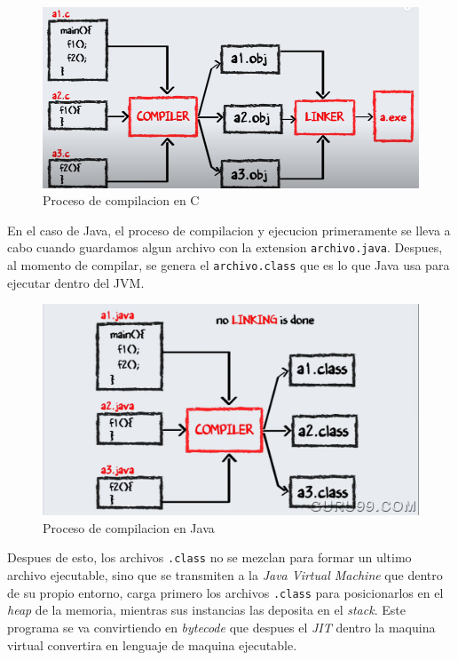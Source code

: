 \documentclass{article}
\begin{document}
		\begin{figure}[H]
			\centering
			\includegraphics[scale = 0.3]{images/comp}
			\caption{Proceso de compilacion en C}
		\end{figure}
		
		En el caso de Java, el proceso de compilacion y ejecucion primeramente se lleva a cabo cuando guardamos algun archivo con la extension \verb*|archivo.java|. Despues, al momento de compilar, se genera el \verb*|archivo.class| que es lo que Java usa para ejecutar dentro del JVM. 
		
		\begin{figure}[H]
			\centering
			\includegraphics[scale = 0.18]{images/javacomp1}
			\caption{Proceso de compilacion en Java}
		\end{figure}
	
		Despues de esto, los archivos \verb*|.class| no se mezclan para formar un ultimo archivo ejecutable, sino que se transmiten a la \emph{Java Virtual Machine} que dentro de su propio entorno, carga primero los archivos \verb*|.class| para posicionarlos en el \emph{heap} de la memoria, mientras sus instancias las deposita en el \emph{stack}. Este programa se va convirtiendo en \emph{bytecode} que despues el \emph{JIT} dentro la maquina virtual convertira en lenguaje de maquina ejecutable.
		
\end{document}
